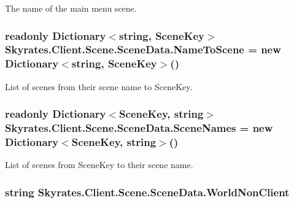 The name of the main menu scene. 

\hypertarget{class_skyrates_1_1_client_1_1_scene_1_1_scene_data_a711010b1f45c341f1617742c94263ceb}{
\subsubsection[{Name\-To\-Scene}]{\setlength{\rightskip}{0pt plus 5cm}readonly Dictionary$<$string, {\bf Scene\-Key}$>$ Skyrates.\-Client.\-Scene.\-Scene\-Data.\-Name\-To\-Scene = new Dictionary$<$string, {\bf Scene\-Key}$>$()}}\label{class_skyrates_1_1_client_1_1_scene_1_1_scene_data_a711010b1f45c341f1617742c94263ceb}


List of scenes from their scene name to Scene\-Key. 

\hypertarget{class_skyrates_1_1_client_1_1_scene_1_1_scene_data_a557060e5171ba38f4763c95b5e2b9c3c}{
\subsubsection[{Scene\-Names}]{\setlength{\rightskip}{0pt plus 5cm}readonly Dictionary$<${\bf Scene\-Key}, string$>$ Skyrates.\-Client.\-Scene.\-Scene\-Data.\-Scene\-Names = new Dictionary$<${\bf Scene\-Key}, string$>$()}}\label{class_skyrates_1_1_client_1_1_scene_1_1_scene_data_a557060e5171ba38f4763c95b5e2b9c3c}


List of scenes from Scene\-Key to their scene name. 

\hypertarget{class_skyrates_1_1_client_1_1_scene_1_1_scene_data_ade8d55070c93f5074a9bf8749d270ef3}{
\subsubsection[{World\-Non\-Client}]{\setlength{\rightskip}{0pt plus 5cm}string Skyrates.\-Client.\-Scene.\-Scene\-Data.\-World\-Non\-Client}}\label{class_skyrates_1_1_client_1_1_scene_1_1_scene_data_ade8d55070c93f5074a9bf8749d270ef3}


